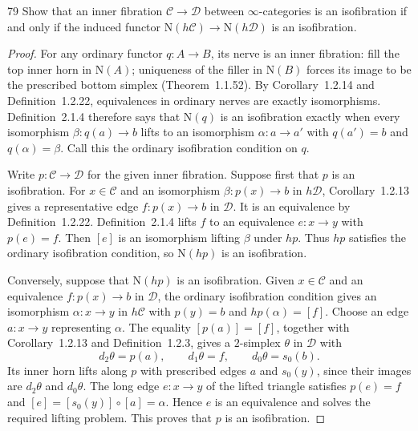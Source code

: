 \begin{exercise}{79}
Show that an inner fibration $\mathcal C\to\mathcal D$ between $\infty$-categories is
an isofibration if and only if the induced functor
$\mathrm N(h\mathcal C)\to\mathrm N(h\mathcal D)$ is an isofibration.

\begin{proof}
For any ordinary functor $q\colon A\to B$, its nerve is an
inner fibration: fill the top inner horn in $\mathrm N(A)$;
uniqueness of the filler in $\mathrm N(B)$ forces its image
to be the prescribed bottom simplex (Theorem~1.1.52).
By Corollary~1.2.14 and Definition~1.2.22, equivalences in
ordinary nerves are exactly isomorphisms.
Definition~2.1.4 therefore says that $\mathrm N(q)$ is an
isofibration exactly when every isomorphism
$\beta\colon q(a)\to b$ lifts to an isomorphism
$\alpha\colon a\to a'$ with $q(a')=b$ and $q(\alpha)=\beta$.
Call this the ordinary isofibration condition on $q$.

Write $p\colon\mathcal C\to\mathcal D$ for the given inner
fibration. Suppose first that $p$ is an isofibration.
For $x\in\mathcal C$ and an isomorphism
$\beta\colon p(x)\to b$ in $h\mathcal D$,
Corollary~1.2.13 gives a representative edge
$f\colon p(x)\to b$ in $\mathcal D$.
It is an equivalence by Definition~1.2.22.
Definition~2.1.4 lifts $f$ to an equivalence
$e\colon x\to y$ with $p(e)=f$.
Then $[e]$ is an isomorphism lifting $\beta$ under $hp$.
Thus $hp$ satisfies the ordinary isofibration condition,
so $\mathrm N(hp)$ is an isofibration.

Conversely, suppose that $\mathrm N(hp)$ is an isofibration.
Given $x\in\mathcal C$ and an equivalence
$f\colon p(x)\to b$ in $\mathcal D$, the ordinary
isofibration condition gives an isomorphism
$\alpha\colon x\to y$ in $h\mathcal C$ with
$p(y)=b$ and $hp(\alpha)=[f]$.
Choose an edge $a\colon x\to y$ representing $\alpha$.
The equality $[p(a)]=[f]$, together with Corollary~1.2.13
and Definition~1.2.3, gives a $2$-simplex $\theta$ in
$\mathcal D$ with
\[
 d_2\theta=p(a),\qquad d_1\theta=f,\qquad d_0\theta=s_0(b).
\]
Its inner horn lifts along $p$ with prescribed edges
$a$ and $s_0(y)$, since their images are $d_2\theta$
and $d_0\theta$.
The long edge $e\colon x\to y$ of the lifted triangle
satisfies $p(e)=f$ and
$[e]=[s_0(y)]\circ[a]=\alpha$.
Hence $e$ is an equivalence and solves the required lifting
problem. This proves that $p$ is an isofibration.
\end{proof}
\end{exercise}
